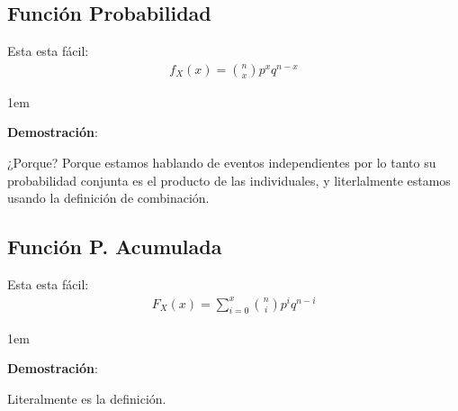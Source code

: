 \documentclass[12pt, fleqn]{report}                             %
\newenvironment{SmallIndentation}[1][0.75em]                    %
        {\begin{adjustwidth}{#1}{}\begin{footnotesize}}             %
        {\end{footnotesize}\end{adjustwidth}}                       %
\theoremstyle{break}                                            %
\begin{document}
            \clearpage
            \subsection{Función Probabilidad}
            
                Esta esta fácil:
                \begin{align*}
                    f_X(x) 
                        = {n \choose x} p^x q^{n - x}
                \end{align*}

                \begin{SmallIndentation}[1em]
                    \textbf{Demostración}:
                    
                    ¿Porque? Porque estamos hablando de eventos independientes por lo
                    tanto su probabilidad conjunta es el producto de las individuales, 
                    y literlalmente estamos usando la definición de combinación.
                
                \end{SmallIndentation}
                        

            \vspace{1em}
            \subsection{Función P. Acumulada}

                    Esta esta fácil:
                    \begin{align*}
                        F_X(x) = \sum_{i=0}^x {n \choose i}p^i q^{n - i}
                    \end{align*}

                    \begin{SmallIndentation}[1em]
                        \textbf{Demostración}:
                        
                        Literalmente es la definición.
                    
                    \end{SmallIndentation}
\end{document}
